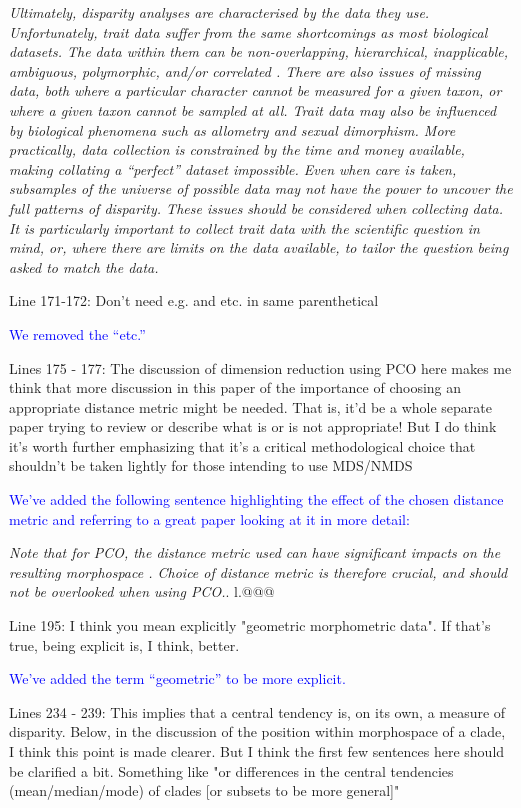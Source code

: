 \documentclass[12pt,letterpaper]{article}
\begin{document}
\textit{Ultimately, disparity analyses are characterised by the data they use. Unfortunately, trait data suffer from the same shortcomings as most biological datasets. The data within them can be non-overlapping, hierarchical, inapplicable, ambiguous, polymorphic, and/or correlated \citep{Palci2018}. There are also issues of missing data, both where a particular character cannot be measured for a given taxon, or where a given taxon cannot be sampled at all. Trait data may also be influenced by biological phenomena such as allometry and sexual dimorphism. More practically, data collection is constrained by the time and money available, making collating a ``perfect'' dataset impossible. Even when care is taken, subsamples of the universe of possible data may not have the power to uncover the full patterns of disparity. These issues should be considered when collecting data. It is particularly important to collect trait data with the scientific question in mind, or, where there are limits on the data available, to tailor the question being asked to match the data. 
}

\noindent Line 171-172: Don't need e.g. and etc. in same parenthetical

\textcolor{blue}{We removed the  ``etc.''}

\noindent Lines 175 - 177: The discussion of dimension reduction using PCO here makes me think that more discussion in this paper of the importance of choosing an appropriate distance metric might be needed. That is, it'd be a whole separate paper trying to review or describe what is or is not appropriate! But I do think it's worth further emphasizing that it's a critical methodological choice that shouldn't be taken lightly for those intending to use MDS/NMDS

\textcolor{blue}{We've added the following sentence highlighting the effect of the chosen distance metric and referring to a great paper looking at it in more detail:}

\textit{Note that for PCO, the distance metric used can have significant impacts on the resulting morphospace \citep{lehmann2019}. Choice of distance metric is therefore crucial, and should not be overlooked when using PCO.}. l.@@@


\noindent Line 195: I think you mean explicitly "geometric morphometric data". If that's true, being explicit is, I think, better.

\textcolor{blue}{We've added the term ``geometric'' to be more explicit.}

\noindent Lines 234 - 239: This implies that a central tendency is, on its own, a measure of disparity. Below, in the discussion of the position within morphospace of a clade, I think this point is made clearer. But I think the first few sentences here should be clarified a bit. Something like "or differences in the central tendencies (mean/median/mode) of clades [or subsets to be more general]"
\end{document}
